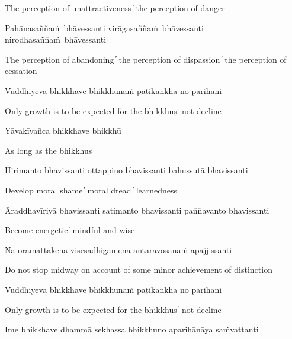 \begin{cprenglish}
  The perception of unattractiveness  ̓  the perception of danger
\end{cprenglish}

Pahānasaññaṁ bhāvessanti virāgasaññaṁ bhāvessanti nirodhasaññaṁ bhāvessanti

\begin{cprenglish}
  The perception of abandoning  ̓  the perception of dispassion  ̓
  the perception of cessation
\end{cprenglish}

Vuddhiyeva bhikkhave bhikkhūnaṁ pāṭikaṅkhā no parihāni

\begin{cprenglish}
  Only growth is to be expected for the bhikkhus  ̓  not decline
\end{cprenglish}

Yāvakīvañca bhikkhave bhikkhū

\begin{cprenglish}
  As long as the bhikkhus
\end{cprenglish}

Hirimanto bhavissanti ottappino bhavissanti bahussutā bhavissanti

\begin{cprenglish}
  Develop moral shame  ̓  moral dread  ̓  learnedness
\end{cprenglish}

Āraddhavīriyā bhavissanti satimanto bhavissanti paññavanto bhavissanti

\begin{cprenglish}
  Become energetic  ̓  mindful and wise
\end{cprenglish}

Na oramattakena visesādhigamena antarāvosānaṁ āpajjissanti

\begin{cprenglish}
  Do not stop midway on account of some minor achievement of distinction
\end{cprenglish}

Vuddhiyeva bhikkhave bhikkhūnaṁ pāṭikaṅkhā no parihāni

\begin{cprenglish}
  Only growth is to be expected for the bhikkhus  ̓  not decline
\end{cprenglish}

\suttaRef{[AN 7.23-27]}

Ime bhikkhave dhammā sekhassa bhikkhuno aparihānāya saṁvattanti

